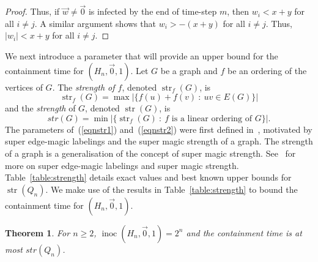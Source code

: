 \documentclass[unknownkeysallowed]{article}
\newtheorem{theorem}{Theorem}[section]
\theoremstyle{definition}\newtheorem{strategy}{Strategy}
\theoremstyle{definition}\newtheorem{notation}{Notation}[theorem]
\DeclareMathOperator{\strength}{str}
\DeclareMathOperator{\inoc}{inoc}
\begin{document}
\begin{proof}
Thus, if $\vec{w} \neq \vec{0}$ is infected by the end of time-step $m$, then $w_i < x+y$ for all $i \neq j$.  A similar argument shows that $w_i > -(x+y)$ for all $i \neq j$.  Thus, $|w_i| < x+y$ for all $i \neq j$.
\end{proof}




We next introduce a parameter that will provide an upper bound for the containment time for $(H_n,\vec{0},1)$. Let $G$ be a graph and $f$ be an ordering of the vertices of $G$. The {\it strength of $f$}, denoted $\strength_f(G)$, is \begin{equation}\label{eqnstr1} \strength_f(G) = \max \big|\{ f(u)+f(v) ~:~ uv \in E(G)\}\big|\end{equation} and the {\it strength} of $G$, denoted $\strength(G)$, is \begin{equation}\label{eqnstr2}str(G) = \min \big|\{ \strength_f(G)~:~ f \text{~is a linear ordering of~} G\}\big|.\end{equation}  The parameters of~(\ref{eqnstr1}) and~(\ref{eqnstr2}) were first defined in~\cite{I.2018}, motivated by super edge-magic labelings and the super magic strength of a graph.  The strength of a graph is a generalisation of the concept of super magic strength.  See~\cite{Av,I.2018} for more on super edge-magic labelings and super magic strength.  Table~\ref{table:strength} details exact values and best known upper bounds for $\strength(Q_n)$. 
We make use of the results in Table~\ref{table:strength} to bound the containment time for $(H_n,\vec{0},1)$.


 \begin{theorem}\label{thm:upperstrongQn} For $n \geq 2$,  $\inoc(H_n,\vec{0},1)=2^n$ and the containment time is at most $str(Q_n)$.
\end{theorem}
\end{document}
